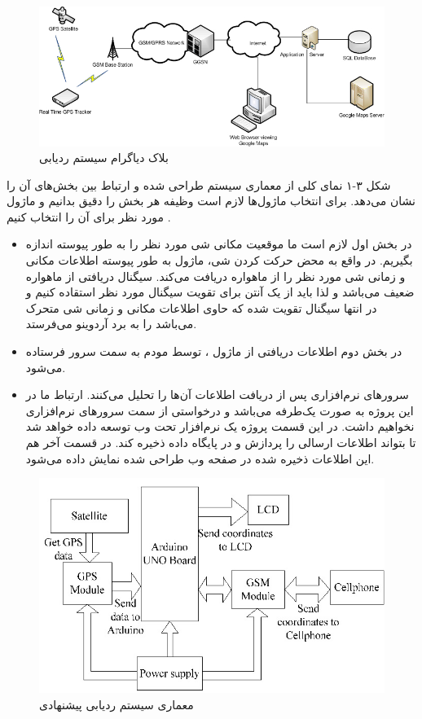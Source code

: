 \begin{figure}[!h]
	\centerline{\includegraphics[width=.8\textwidth]{GPS_Tracker}}
	\caption{بلاک دیاگرام سیستم ردیابی \cite{Mohamad2016}}
\end{figure}
شکل ۳-۱ نمای کلی از معماری سیستم طراحی شده و ارتباط بین بخش‌های آن را نشان می‌دهد. برای انتخاب ماژول‌ها لازم است وظیفه هر بخش را دقیق بدانیم و ماژول مورد نظر برای آن را انتخاب کنیم \cite{Agrawal2018}.
\begin{itemize}
	\item 
	در بخش اول لازم است ما موقعیت مکانی شی مورد نظر را به طور پیوسته اندازه بگیریم. در واقع به محض حرکت کردن شی، ماژول  به طور پیوسته اطلاعات مکانی و زمانی شی مورد نظر را از ماهواره دریافت می‌کند. سیگنال دریافتی از ماهواره ضعیف می‌باشد و لذا باید از یک آنتن برای تقویت سیگنال مورد نظر استقاده کنیم و در انتها سیگنال تقویت شده که حاوی اطلاعات مکانی و زمانی شی متحرک می‌باشد را به برد آردوینو می‌فرستد.
	\item 
	در بخش دوم اطلاعات دریافتی از ماژول ، توسط مودم  به سمت سرور فرستاده می‌شود.
	\item 
	سرورهای نرم‌افزاری پس از دریافت اطلاعات آن‌ها را تحلیل می‌کنند. ارتباط ما در این پروژه به صورت یک‌طرفه می‌باشد و درخواستی از سمت سرورهای نرم‌افزاری نخواهیم داشت. در این قسمت پروژه یک نرم‌افزار تحت وب توسعه داده خواهد شد تا بتواند اطلاعات ارسالی را پردازش و در پایگاه داده ذخیره کند. در قسمت آخر هم این اطلاعات ذخیره شده در صفحه وب طراحی شده نمایش داده می‌شود. 	 
\end{itemize}
\begin{figure}[!h]
	\centerline{\includegraphics[width=.6\textwidth]{blockdiagram}}
	\caption{معماری سیستم ردیابی پیشنهادی \cite{Rahman2016}}
\end{figure}
